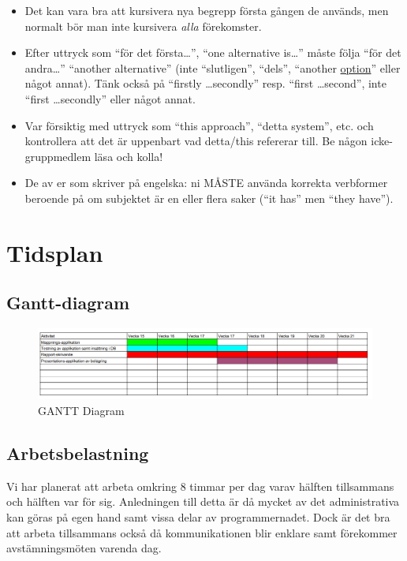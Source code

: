 \documentclass[swedish, a4paper,12pt]{article}
\begin{document}
\begin{itemize}
\item    Det kan vara bra att kursivera nya begrepp första gången de används, men normalt bör man inte kursivera \emph{alla} förekomster.

\item    Efter uttryck som ``för det första\ldots'', ``one alternative is\ldots'' måste följa ``för det andra\ldots'' ``another alternative'' (inte ``slutligen'', ``dels'', ``another \underline{option}'' eller något annat).  Tänk också på ``firstly \ldots secondly'' resp. ``first \ldots second'', inte ``first \ldots secondly'' eller något annat.

\item    Var försiktig med uttryck som ``this approach'', ``detta system'', etc. och kontrollera att det är uppenbart vad detta/this refererar till. Be någon icke-gruppmedlem läsa och kolla!

\item    De av er som skriver på engelska: ni MÅSTE använda korrekta verbformer beroende på om subjektet är en eller flera saker (``it has'' men ``they have'').
\end{itemize}
\fi

\iffalse
\section{Tidsplan}
\subsection{Gantt-diagram}

\begin{figure}[h]
	\includegraphics[width=15cm]{media/GANTT.png}
	\caption{GANTT Diagram}
	\label{}
\end{figure}

\subsection{Arbetsbelastning}
Vi har planerat att arbeta omkring 8 timmar per dag varav hälften tillsammans och hälften var för sig. Anledningen till detta är då mycket av det administrativa kan göras på egen hand samt vissa delar av programmernadet. Dock är det bra att arbeta tillsammans också då kommunikationen blir enklare samt förekommer avstämningsmöten varenda dag.
\end{document}
